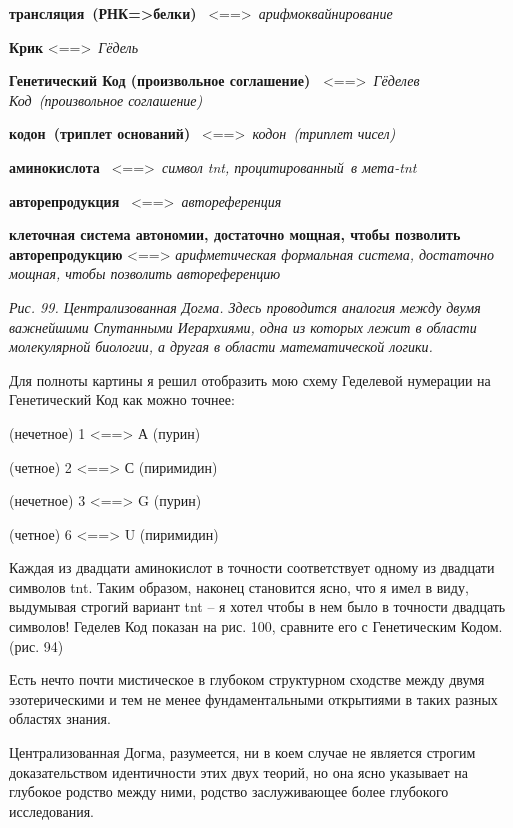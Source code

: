 \documentclass[../main.tex]{subfiles}
\begin{document}
\textbf{трансляция~(РНК=\textgreater белки)} ~\textless==\textgreater~\emph{арифмоквайнирование}

\textbf{Крик} \textless==\textgreater~\emph{Гёдель} ~

\textbf{Генетический Код (произвольное соглашение)~} \textless==\textgreater~\emph{Гёделев Код~(произвольное соглашение)}

\textbf{кодон~(триплет оснований)} ~\textless==\textgreater~\emph{кодон~(триплет чисел)}

\textbf{аминокислота} ~\textless==\textgreater~\emph{символ \acs{tnt}, процитированный~в мета-\acs{tnt}}

\textbf{авторепродукция} ~\textless==\textgreater~\emph{автореференция}

\textbf{клеточная система автономии, достаточно мощная, чтобы позволить авторепродукцию} \textless==\textgreater{} \emph{арифметическая формальная система, достаточно мощная, чтобы позволить автореференцию}

\emph{Рис. 99. Централизованная Догма. Здесь проводится аналогия между двумя важнейшими Спутанными Иерархиями, одна из которых лежит в области молекулярной биологии, а другая в области математической логики.}

Для полноты картины я решил отобразить мою схему Геделевой нумерации на Генетический Код как можно точнее:

(нечетное) 1 \textless==\textgreater{} А (пурин)

(четное) 2 \textless==\textgreater{} С (пиримидин)

(нечетное) 3 \textless==\textgreater{} G (пурин)

(четное) 6 \textless==\textgreater{} U (пиримидин)

Каждая из двадцати аминокислот в точности соответствует одному из двадцати символов \acs{tnt}\@. Таким образом, наконец становится ясно, что я имел в виду, выдумывая строгий вариант \acs{tnt} \--- я хотел чтобы в нем было в точности двадцать символов! Геделев Код показан на рис. 100, сравните его с Генетическим Кодом. (рис. 94)

Есть нечто почти мистическое в глубоком структурном сходстве между двумя эзотерическими и тем не менее фундаментальными открытиями в таких разных областях знания.

Централизованная Догма, разумеется, ни в коем случае не является строгим доказательством идентичности этих двух теорий, но она ясно указывает на глубокое родство между ними, родство заслуживающее более глубокого исследования.
\end{document}
